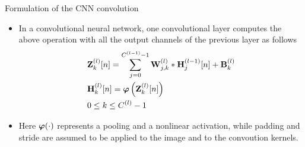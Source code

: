 \documentclass{beamer}
\begin{document}
\begin{frame}{Formulation of the CNN convolution}
\begin{itemize}
    \item In a convolutional neural network, one convolutional layer computes the above operation with all the output channels of the previous layer as follows
    \begin{equation}
\begin{split}
    &{\bf Z}^{(l)}_k[n] = \sum_{j=0}^{C^{(l-1)}-1} {\bf W}^{(l)}_{j,k} * {\bf H}^{(l-1)}_j[n] + {\bf B}^{(l)}_k \\
    &{\bf H}^{(l)}_k[n] = {\boldsymbol \varphi}\left( {\bf Z}^{(l)}_k[n] \right)\\
    &0\leq k \leq C^{(l)}-1
\end{split}
\end{equation}
\item Here ${\boldsymbol \varphi}(\cdot)$ represents a pooling and a nonlinear activation, while padding and stride are assumed to be applied to the image and to the convoution kernels. 
\end{itemize}
\end{frame}
\end{document}

